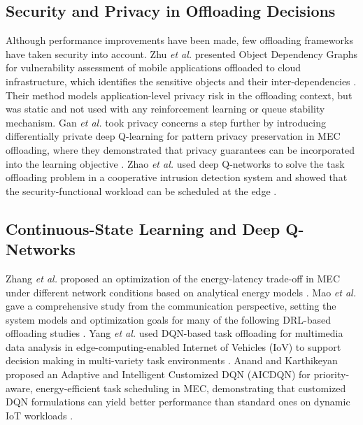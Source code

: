 \documentclass{ieeeaccess}
\begin{document}
\subsection{Security and Privacy in Offloading Decisions}
Although performance improvements have been made, few offloading frameworks have taken security into account. Zhu \emph{et al.} presented Object Dependency Graphs for vulnerability assessment of mobile applications offloaded to cloud infrastructure, which identifies the sensitive objects and their inter-dependencies \cite{zhu2013}. Their method models application-level privacy risk in the offloading context, but was static and not used with any reinforcement learning or queue stability mechanism. Gan \emph{et al.} took privacy concerns a step further by introducing differentially private deep Q-learning for pattern privacy preservation in MEC offloading, where they demonstrated that privacy guarantees can be incorporated into the learning objective \cite{gan2023}. Zhao \emph{et al.} used deep Q-networks to solve the task offloading problem in a cooperative intrusion detection system and showed that the security-functional workload can be scheduled at the edge \cite{zhao2022}.

\subsection{Continuous-State Learning and Deep Q-Networks}
Zhang \emph{et al.} proposed an optimization of the energy-latency trade-off in MEC under different network conditions based on analytical energy models \cite{zhang2018}. Mao \emph{et al.} gave a comprehensive study from the communication perspective, setting the system models and optimization goals for many of the following DRL-based offloading studies \cite{mao2017}. Yang \emph{et al.} used DQN-based task offloading for multimedia data analysis in edge-computing-enabled Internet of Vehicles (IoV) to support decision making in multi-variety task environments \cite{yang2022}. Anand and Karthikeyan proposed an Adaptive and Intelligent Customized DQN (AICDQN) for priority-aware, energy-efficient task scheduling in MEC, demonstrating that customized DQN formulations can yield better performance than standard ones on dynamic IoT workloads \cite{anand2026}.
\end{document}
